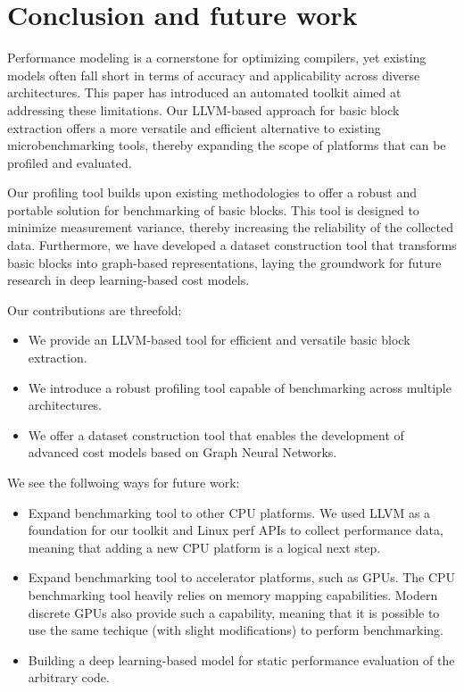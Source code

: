 \section{Conclusion and future work}

Performance modeling is a cornerstone for optimizing compilers, yet existing models often 
fall short in terms of accuracy and applicability across diverse architectures. This paper 
has introduced an automated toolkit aimed at addressing these limitations. Our LLVM-based 
approach for basic block extraction offers a more versatile and efficient alternative to existing 
microbenchmarking tools, thereby expanding the scope of platforms that can be profiled and evaluated. 

Our profiling tool builds upon existing methodologies to offer a robust and portable solution for 
benchmarking of basic blocks. This tool is designed to minimize measurement variance, thereby 
increasing the reliability of the collected data. Furthermore, we have developed a dataset construction 
tool that transforms basic blocks into graph-based representations, laying the groundwork for future 
research in deep learning-based cost models.

Our contributions are threefold:
\begin{itemize}
    \item We provide an LLVM-based tool for efficient and versatile basic block extraction.
    \item We introduce a robust profiling tool capable of benchmarking across multiple architectures.
    \item We offer a dataset construction tool that enables the development of advanced cost models based on Graph Neural Networks.
\end{itemize}

We see the follwoing ways for future work:
\begin{itemize}
  \item Expand benchmarking tool to other CPU platforms. We used LLVM as a foundation for our 
        toolkit and Linux perf APIs to collect performance data, meaning that adding a new CPU
        platform is a logical next step.
  \item Expand benchmarking tool to accelerator platforms, such as GPUs. The CPU benchmarking tool
        heavily relies on memory mapping capabilities. Modern discrete GPUs also provide such a capability,
        meaning that it is possible to use the same techique (with slight modifications) to perform benchmarking.
  \item Building a deep learning-based model for static performance evaluation of the arbitrary code.
\end{itemize}
